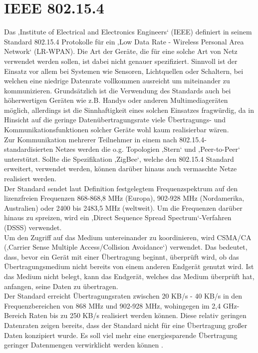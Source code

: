 \section{IEEE 802.15.4}\label{ss:IEEE802154}

Das ‚Institute of Electrical and Electronics Engineers‘ (IEEE) definiert in seinem Standard 802.15.4 Protokolle für ein ‚Low Data Rate - Wireless Personal Area Network‘ (LR-WPAN). Die Art der Geräte, die für eine solche Art von Netz verwendet werden sollen, ist dabei nicht genauer spezifiziert. Sinnvoll ist der Einsatz vor allem bei Systemen wie Sensoren, Lichtquellen oder Schaltern, bei welchen eine niedrige Datenrate vollkommen ausreicht um miteinander zu kommunizieren. Grundsätzlich ist die Verwendung des Standards auch bei höherwertigen Geräten wie z.B. Handys oder anderen Multimediageräten möglich, allerdings ist die Sinnhaftigkeit eines solchen Einsatzes fragwürdig, da in Hinsicht auf die geringe Datenübertragungsrate viele Übertragungs- und Kommunikationsfunktionen solcher Geräte wohl kaum realisierbar wären. \\
Zur Kommunikation mehrerer Teilnehmer in einem nach 802.15.4-standardisierten Netzes werden die o.g. Topologien ‚Stern‘ und ‚Peer-to-Peer‘ unterstützt. Sollte die Spezifikation ‚ZigBee‘,  welche den 802.15.4 Standard erweitert, verwendet werden, können darüber hinaus auch vermaschte Netze realisiert werden. \\
Der Standard sendet laut Definition festgelegtem Frequenzspektrum auf den lizenzfreien Frequenzen 868-868,8 MHz (Europa), 902-928 MHz (Nordamerika, Australien) oder 2400 bis 2483,5 MHz (weltweit). Um die Frequenzen darüber hinaus zu spreizen, wird ein ‚Direct Sequence Spread Spectrum‘-Verfahren (DSSS) verwendet.\\ 
Um den Zugriff auf das Medium untereinander zu koordinieren, wird CSMA/CA (‚Carrier Sense Multiple Access/Collision Avoidance‘) verwendet. Das bedeutet, dass, bevor ein Gerät mit einer Übertragung beginnt, überprüft wird, ob das Übertragungsmedium nicht bereits von einem anderen Endgerät genutzt wird. Ist das Medium nicht belegt, kann das Endgerät, welches das Medium überprüft hat, anfangen, seine Daten zu übertragen.\\
Der Standard erreicht Übertragungsraten zwischen 20 KB/s - 40 KB/s in den Frequenzbereichen von 868 MHz und 902-928 MHz, wohingegen im 2,4 GHz-Bereich Raten bis zu 250 KB/s realisiert werden können. Diese relativ geringen Datenraten zeigen bereits, dass der Standard nicht für eine Übertragung großer Daten konzipiert wurde. Es soll viel mehr eine energiesparende Übertragung geringer Datenmengen verwirklicht werden können \cite{d:hesse}.


